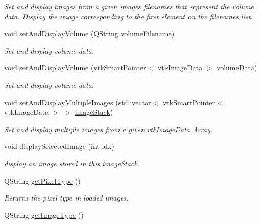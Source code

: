 \begin{DoxyCompactItemize}
\begin{DoxyCompactList}\small\item\em Set and display images from a given images filenames that represent the volume data. Display the image corresponding to the first element on the filenames list. \end{DoxyCompactList}\item 
void \hyperlink{class_q_v_t_k_image_widget_ade574690f481377265c548816d7fd944}{set\-And\-Display\-Volume} (Q\-String volume\-Filename)
\begin{DoxyCompactList}\small\item\em Set and display volume data. \end{DoxyCompactList}\item 
void \hyperlink{class_q_v_t_k_image_widget_a3b0b5b058b7ce1b89bc25337cf30c29e}{set\-And\-Display\-Volume} (vtk\-Smart\-Pointer$<$ vtk\-Image\-Data $>$ \hyperlink{class_q_v_t_k_image_widget_a5e2dcad8b7ea1a85c4b8052e9452844c}{volume\-Data})
\begin{DoxyCompactList}\small\item\em Set and display volume data. \end{DoxyCompactList}\item 
void \hyperlink{class_q_v_t_k_image_widget_ae2b3f8c58a1c1162ce506b6da4a49e4c}{set\-And\-Display\-Multiple\-Images} (std\-::vector$<$ vtk\-Smart\-Pointer$<$ vtk\-Image\-Data $>$ $>$ \hyperlink{class_q_v_t_k_image_widget_a336708e27578dab885b069f12c120138}{image\-Stack})
\begin{DoxyCompactList}\small\item\em Set and display multiple images from a given vtk\-Image\-Data Array. \end{DoxyCompactList}\item 
void \hyperlink{class_q_v_t_k_image_widget_a74232311be68637533974b68b4d63bc5}{display\-Selected\-Image} (int idx)
\begin{DoxyCompactList}\small\item\em display an image stored in this image\-Stack. \end{DoxyCompactList}\item 
Q\-String \hyperlink{class_q_v_t_k_image_widget_acb6c70c4b6e1394b0054d0902e72fcbf}{get\-Pixel\-Type} ()
\begin{DoxyCompactList}\small\item\em Returns the pixel type in loaded images. \end{DoxyCompactList}\item 
Q\-String \hyperlink{class_q_v_t_k_image_widget_af0626a3fda57807caecbbe115e95d409}{get\-Image\-Type} ()

\end{DoxyCompactItemize}
